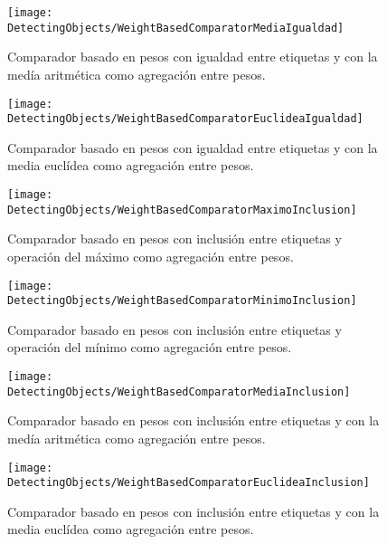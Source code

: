 \begin{figure}[htpb]
  \centering
  \texttt{[image: DetectingObjects/WeightBasedComparatorMediaIgualdad]}
  \caption{Comparador basado en pesos con igualdad entre etiquetas y con la medía aritmética como agregación entre pesos.}
  \label{fig:WeightBasedComparatorMediaIgualdad}
\end{figure}

\begin{figure}[htpb]
  \centering
  \texttt{[image: DetectingObjects/WeightBasedComparatorEuclideaIgualdad]}
  \caption{Comparador basado en pesos con igualdad entre etiquetas y con la media euclídea como agregación entre pesos.}
  \label{fig:WeightBasedComparatorEuclideaIgualdad}
\end{figure}

\begin{figure}[htpb]
  \centering
  \texttt{[image: DetectingObjects/WeightBasedComparatorMaximoInclusion]}
  \caption{Comparador basado en pesos con inclusión entre etiquetas y operación del máximo como agregación entre pesos.}
  \label{fig:WeightBasedComparatorMaximoInclusion}
\end{figure}

\begin{figure}[htpb]
  \centering
  \texttt{[image: DetectingObjects/WeightBasedComparatorMinimoInclusion]}
  \caption{Comparador basado en pesos con inclusión entre etiquetas y operación del mínimo como agregación entre pesos.}
  \label{fig:WeightBasedComparatorMinimoInclusion}
\end{figure}

\begin{figure}[htpb]
  \centering
  \texttt{[image: DetectingObjects/WeightBasedComparatorMediaInclusion]}
  \caption{Comparador basado en pesos con inclusión entre etiquetas y con la medía aritmética como agregación entre pesos.}
  \label{fig:WeightBasedComparatorMediaInclusion}
\end{figure}

\begin{figure}[htpb]
  \centering
  \texttt{[image: DetectingObjects/WeightBasedComparatorEuclideaInclusion]}
  \caption{Comparador basado en pesos con inclusión entre etiquetas y con la media euclídea como agregación entre pesos.}
  \label{fig:WeightBasedComparatorEuclideaInclusion}
\end{figure}

